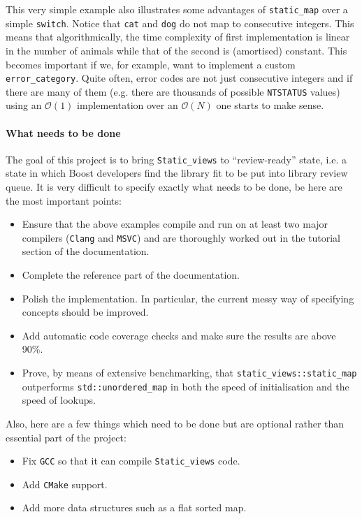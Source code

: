 \documentclass[a4paper,12pt]{article}
\begin{document}
    This very simple example also illustrates some advantages of
    \texttt{static\_map} over a simple \texttt{switch}. Notice that \texttt{cat}
    and \texttt{dog} do not map to consecutive integers. This means that
    algorithmically, the time complexity of first implementation is linear in
    the number of animals while that of the second is (amortised) constant. This
    becomes important if we, for example, want to implement a custom
    \texttt{error\_category}. Quite often, error codes are not just consecutive
    integers and if there are many of them (e.g. there are thousands of possible
    \texttt{NTSTATUS} values) using an $\mathcal{O}(1)$ implementation over an
    $\mathcal{O}(N)$ one starts to make sense.

    \paragraph{What needs to be done} The goal of this project is to bring
    \texttt{Static\_views} to ``review-ready'' state, i.e. a state in which
    Boost developers find the library fit to be put into library review queue.
    It is very difficult to specify exactly what needs to be done, be here are
    the most important points:
    \begin{itemize}
        \item Ensure that the above examples compile and run on at least two
            major compilers (\texttt{Clang} and \texttt{MSVC}) and are
            thoroughly worked out in the tutorial section of the documentation.
        \item Complete the reference part of the documentation.
        \item Polish the implementation. In particular, the current messy way of
            specifying concepts should be improved.
        \item Add automatic code coverage checks and make sure the results are
            above 90\%.
        \item Prove, by means of extensive benchmarking, that
            \texttt{static\_views::static\_map} outperforms
            \texttt{std::unordered\_map} in both the speed of initialisation and
            the speed of lookups.
    \end{itemize}
    Also, here are a few things which need to be done but are optional rather
    than essential part of the project:
    \begin{itemize}
        \item Fix \texttt{GCC} so that it can compile \texttt{Static\_views}
            code.
        \item Add \texttt{CMake} support.
        \item Add more data structures such as a flat sorted map.
    \end{itemize}
\end{document}
